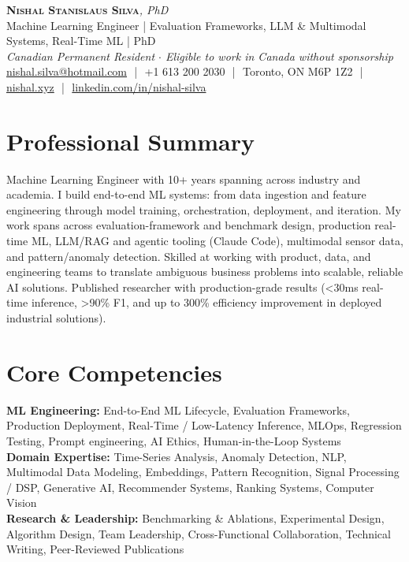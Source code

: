 \documentclass[11pt]{article}
\begin{document}
\pagestyle{empty}
\begin{center}
    {\LARGE \scshape \textbf{Nishal Stanislaus Silva}}{\large \textit{, PhD}}
    \\[1pt]
    {\small Machine Learning Engineer | Evaluation Frameworks, LLM \& Multimodal Systems, Real-Time ML | PhD}
    \\[1pt]
    {\footnotesize\textit{Canadian Permanent Resident $\cdot$ Eligible to work in Canada without sponsorship}}
    \\[1pt]
    {\small \href{mailto:nishal.silva@hotmail.com}{nishal.silva@hotmail.com}
    \,\,|\,\, +1 613 200 2030
    \,\,|\,\, Toronto, ON M6P 1Z2
    \,\,|\,\, \href{https://nishal.xyz}{nishal.xyz}
    \,\,|\,\, \href{https://www.linkedin.com/in/nishal-silva}{linkedin.com/in/nishal-silva}}
\end{center}

\section*{Professional Summary}
Machine Learning Engineer with 10+ years spanning across industry and academia. I build end-to-end ML systems: from data ingestion and feature engineering through model training, orchestration, deployment, and iteration. My work spans across evaluation-framework and benchmark design, production real-time ML, LLM/RAG and agentic tooling (Claude Code), multimodal sensor data, and pattern/anomaly detection. Skilled at working with product, data, and engineering teams to translate ambiguous business problems into scalable, reliable AI solutions. Published researcher with production-grade results (<30ms real-time inference, >90\% F1, and up to 300\% efficiency improvement in deployed industrial solutions).

\section*{Core Competencies}
\textbf{ML Engineering:} End-to-End ML Lifecycle, Evaluation Frameworks, Production Deployment, Real-Time / Low-Latency Inference, MLOps, Regression Testing, Prompt engineering, AI Ethics, Human-in-the-Loop Systems\\
\textbf{Domain Expertise:} Time-Series Analysis, Anomaly Detection, NLP, Multimodal Data Modeling, Embeddings, Pattern Recognition, Signal Processing / DSP, Generative AI, Recommender Systems, Ranking Systems, Computer Vision\\
\textbf{Research \& Leadership:} Benchmarking \& Ablations, Experimental Design, Algorithm Design, Team Leadership, Cross-Functional Collaboration, Technical Writing, Peer-Reviewed Publications
\end{document}
